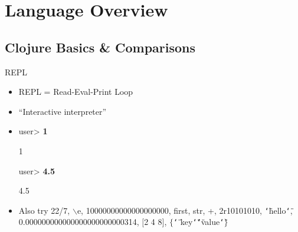 \documentclass{beamer}
\renewcommand{\textquotedbl}{\texttt{\char`\"}}
\begin{document}
\section{Language Overview}

\subsection{Clojure Basics \& Comparisons}

\begin{frame}{REPL}
  \begin{itemize}
  \item REPL = Read-Eval-Print Loop
  \item ``Interactive interpreter''
  \item 
{\ttfamily\color{black}
%
\textcolor[rgb]{0.49803922,0.0,0.49803922}{user{\textgreater}
}\textbf{1}}

{\ttfamily\color{black}
1}

{\ttfamily\color{black}
\textcolor[rgb]{0.49803922,0.0,0.49803922}{user{\textgreater}
}\textbf{4.5}}

{\ttfamily\color{black}
4.5}
  \item Also try 22/7, 
    $\backslash$e, 10000000000000000000, first, str, +, 2r10101010,
    \textquotedbl hello\textquotedbl,
    0.000000000000000000000000314, $[$2 4 8$]$, $\lbrace$\textquotedbl
      key\textquotedbl \textquotedbl value\textquotedbl $\rbrace$
  \end{itemize}
\end{frame}
\end{document}
